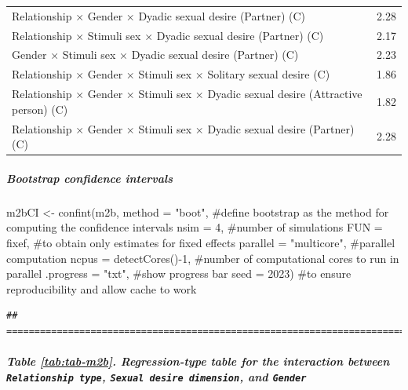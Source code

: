\documentclass[
  bookmarksnumbered]{article}
\newenvironment{Shaded}{\begin{snugshade}}{\end{snugshade}}
\newcommand{\AttributeTok}[1]{\textcolor[rgb]{0.80,0.80,0.80}{#1}}
\newcommand{\CommentTok}[1]{\textcolor[rgb]{0.50,0.62,0.50}{#1}}
\newcommand{\DecValTok}[1]{\textcolor[rgb]{0.86,0.86,0.80}{#1}}
\newcommand{\FunctionTok}[1]{\textcolor[rgb]{0.94,0.94,0.56}{#1}}
\newcommand{\NormalTok}[1]{\textcolor[rgb]{0.80,0.80,0.80}{#1}}
\newcommand{\OtherTok}[1]{\textcolor[rgb]{0.94,0.94,0.56}{#1}}
\newcommand{\SpecialCharTok}[1]{\textcolor[rgb]{0.86,0.64,0.64}{#1}}
\newcommand{\StringTok}[1]{\textcolor[rgb]{0.80,0.58,0.58}{#1}}
\begin{document}
\begin{table}[H]
\begin{tabular}[t]{lc}
Relationship × Gender × Dyadic sexual desire (Partner) (C) & 2.28\\
Relationship × Stimuli sex × Dyadic sexual desire (Partner) (C) & 2.17\\
Gender × Stimuli sex × Dyadic sexual desire (Partner) (C) & 2.23\\
Relationship × Gender × Stimuli sex × Solitary sexual desire (C) & 1.86\\
Relationship × Gender × Stimuli sex × Dyadic sexual desire (Attractive person) (C) & 1.82\\
Relationship × Gender × Stimuli sex × Dyadic sexual desire (Partner) (C) & 2.28\\
\bottomrule
\end{tabular}
\end{table}

\hypertarget{bootstrap-confidence-intervals-1}{%
\subparagraph{Bootstrap confidence intervals}\label{bootstrap-confidence-intervals-1}}

\begin{Shaded}
\begin{Highlighting}[]
\NormalTok{m2bCI }\OtherTok{\textless{}{-}} \FunctionTok{confint}\NormalTok{(m2b, }
                 \AttributeTok{method =} \StringTok{"boot"}\NormalTok{, }\CommentTok{\#define bootstrap as the method for computing the confidence intervals}
                 \AttributeTok{nsim =} \DecValTok{4}\NormalTok{, }\CommentTok{\#number of simulations}
                 \AttributeTok{FUN =}\NormalTok{ fixef, }\CommentTok{\#to obtain only estimates for fixed effects}
                 \AttributeTok{parallel =} \StringTok{"multicore"}\NormalTok{, }\CommentTok{\#parallel computation}
                 \AttributeTok{ncpus =} \FunctionTok{detectCores}\NormalTok{()}\SpecialCharTok{{-}}\DecValTok{1}\NormalTok{, }\CommentTok{\#number of computational cores to run in parallel}
                 \AttributeTok{.progress =} \StringTok{"txt"}\NormalTok{, }\CommentTok{\#show progress bar}
                 \AttributeTok{seed =} \DecValTok{2023}\NormalTok{) }\CommentTok{\#to ensure reproducibility and allow cache to work}
\end{Highlighting}
\end{Shaded}

\begin{verbatim}
## ================================================================================
\end{verbatim}

\hypertarget{table-reftabtab-m2b.-regression-type-table-for-the-interaction-between-relationship-type-sexual-desire-dimension-and-gender}{%
\subparagraph{\texorpdfstring{Table \ref{tab:tab-m2b}. Regression-type table for the interaction between \texttt{Relationship\ type}, \texttt{Sexual\ desire\ dimension}, and \texttt{Gender}}{Table \ref{tab:tab-m2b}. Regression-type table for the interaction between Relationship type, Sexual desire dimension, and Gender}}\label{table-reftabtab-m2b.-regression-type-table-for-the-interaction-between-relationship-type-sexual-desire-dimension-and-gender}}
\end{document}
